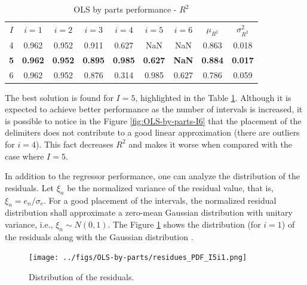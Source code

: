 \documentclass[english]{sobraep}
\begin{document}
\begin{table}[H]
	\centering
	\caption{OLS by parts performance - \(R^2\)}
	\footnotesize
	\setlength{\tabcolsep}{5pt}
	\begin{tabular}{ccccccccc}
		\hline
		\multirow{2}{*}{\(I\)} & \multirow{2}{*}{\(i=1\)} & \multirow{2}{*}{\(i=2\)} & \multirow{2}{*}{\(i=3\)} & \multirow{2}{*}{\(i=4\)} & \multirow{2}{*}{\(i=5\)} & \multirow{2}{*}{\(i=6\)} & \multirow{2}{*}{\(\mu_{R^2}\)} & \multirow{2}{*}{\(\sigma_{R^2}^2\)} \\
		&  &  & \\		
		\hline
		4 & 0.962 & 0.952 & 0.911 & 0.627 & NaN & NaN & 0.863 & 0.018 \\
        \hline
		\textbf{5} &  \textbf{0.962}  & \textbf{0.952} & \textbf{0.895} & \textbf{0.985} & \textbf{0.627} & \textbf{NaN} & \textbf{0.884} & \textbf{0.017} \\
		\hline
		6 & 0.962 & 0.952 & 0.876 & 0.314 & 0.985 & 0.627 & 0.786 & 0.059 \\
		\hline
	\end{tabular} \label{tab:OLS-performance}
\end{table}

The best solution is found for \(I=5\), highlighted in the Table \ref{tab:OLS-performance}. Although it is expected to achieve better performance as the number of intervals is increased, it is possible to notice in the Figure \ref{fig:OLS-by-parts-I6} that the placement of the delimiters does not contribute to a good linear approximation (there are outliers for \(i=4\)). This fact decreases \(R^2\) and makes it worse when compared with the case where \(I=5\).

In addition to the regressor performance, one can analyze the distribution of the residuals. Let \(\xi_n\) be the normalized variance of the residual value, that is, \(\xi_n = e_n/\sigma_e\). For a good placement of the intervals, the normalized residual distribution shall approximate a zero-mean Gaussian distribution with unitary variance, i.e., \(\xi_n \sim N(0, 1)\). The Figure \ref{fig:distribution} shows the distribution (for \(i=1\)) of the residuals along with the Gaussian distribution \cite{leon1994probability}.

\begin{figure}[H]
    \centering
    \texttt{[image: ../figs/OLS-by-parts/residues\_PDF\_I5i1.png]}
    \caption{Distribution of the residuals.}
    \label{fig:distribution}
\end{figure}
\end{document}
